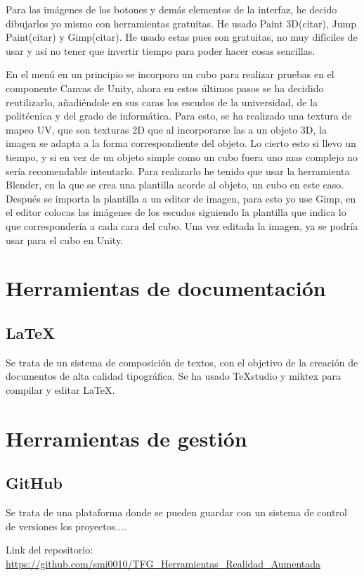 Para las imágenes de los botones y demás elementos de la interfaz, he decido dibujarlos yo mismo con herramientas gratuitas. He usado Paint 3D(citar), Jump Paint(citar) y Gimp(citar). He usado estas pues son gratuitas, no muy difíciles de usar y así no tener que invertir tiempo para poder hacer cosas sencillas.



En el menú en un principio se incorporo un cubo para realizar pruebas en el componente Canvas de Unity, ahora en estos últimos pasos se ha decidido reutilizarlo, añadiéndole en sus caras los escudos de la universidad, de la politécnica y del grado de informática. Para esto, se ha realizado una textura de mapeo UV, que son texturas 2D que al incorporarse las a un objeto 3D, la imagen se adapta a la forma correspondiente del objeto. Lo cierto esto si llevo un tiempo, y si en vez de un objeto simple como un cubo fuera uno mas complejo no sería recomendable intentarlo. Para realizarlo he tenido que usar la herramienta Blender, en la que se crea una plantilla acorde al objeto, un cubo en este caso. Después se importa la plantilla a un editor de imagen, para esto yo use Gimp, en el editor colocas las imágenes de los escudos siguiendo la plantilla que indica lo que correspondería a cada cara del cubo. Una vez editada la imagen, ya se podría usar para el cubo en Unity.




\section{Herramientas de documentación}
\subsection{\LaTeX} 
Se trata de un sistema de composición de textos, con el objetivo de la creación de documentos de alta calidad tipográfica. Se ha usado TeXstudio y miktex para compilar y editar \LaTeX.
\section{Herramientas de gestión}
\subsection{GitHub}
Se trata de una plataforma donde se pueden guardar con un sistema de control de versiones los proyectos....

 Link del repositorio: \url{https://github.com/smi0010/TFG_Herramientas_Realidad_Aumentada}

